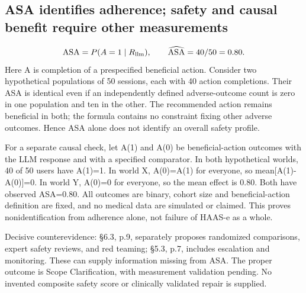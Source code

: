 \documentclass[10pt]{article}
\begin{document}
\subsection*{ASA identifies adherence; safety and causal benefit require other measurements}
\[\operatorname{ASA}=P(A=1\mid R_{\rm llm}),\qquad \widehat{\operatorname{ASA}}=40/50=0.80.\] Here A is completion of a prespecified beneficial action. Consider two hypothetical populations of 50 sessions, each with 40 action completions. Their ASA is identical even if an independently defined adverse-outcome count is zero in one population and ten in the other. The recommended action remains beneficial in both; the formula contains no constraint fixing other adverse outcomes. Hence ASA alone does not identify an overall safety profile.\par
For a separate causal check, let A(1) and A(0) be beneficial-action outcomes with the LLM response and with a specified comparator. In both hypothetical worlds, 40 of 50 users have A(1)=1. In world X, A(0)=A(1) for everyone, so mean[A(1)-A(0)]=0. In world Y, A(0)=0 for everyone, so the mean effect is 0.80. Both have observed ASA=0.80. All outcomes are binary, cohort size and beneficial-action definition are fixed, and no medical data are simulated or claimed. This proves nonidentification from adherence alone, not failure of HAAS-e as a whole.\par
Decisive counterevidence: §6.3, p.9, separately proposes randomized comparisons, expert safety reviews, and red teaming; §5.3, p.7, includes escalation and monitoring. These can supply information missing from ASA. The proper outcome is Scope Clarification, with measurement validation pending. No invented composite safety score or clinically validated repair is supplied.\par
\end{document}
